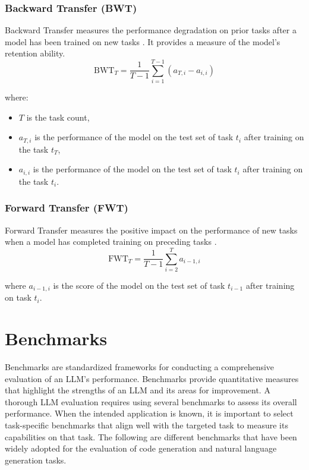 \subsubsection{Backward Transfer (BWT)} \label{bwt}
Backward Transfer measures the performance degradation on prior tasks after a model has been trained on new tasks \cite{wu2023online}. It provides a measure of the model’s retention ability.
\begin{equation}
\text{BWT}_T = \frac{1}{T-1} \sum_{i=1}^{T-1} \left( a_{T,i} - a_{i,i} \right)
\end{equation}

where:
\begin{itemize}
\item \( T \) is the task count,
\item \( a_{T,i} \) is the performance of the model on the test set of task \( t_i \) after training on the task \( t_T \),
\item \( a_{i,i} \) is the performance of the model on the test set of task \( t_i \) after training on the task \( t_i \).
\end{itemize}


\subsubsection{Forward Transfer (FWT)} \label{fwt}
Forward Transfer measures the positive impact on the performance of new tasks when a model has completed training on preceding tasks \cite{wu2023online}.
\begin{equation}
\text{FWT}_T = \frac{1}{T-1} \sum_{i=2}^{T} a_{i-1,i}
\end{equation}

where \( a_{i-1,i} \) is the score of the model on the test set of task \( t_{i-1} \) after training on task \( t_i \).



\section{Benchmarks} \label{benchmarks}
Benchmarks are standardized frameworks for conducting a comprehensive evaluation of an LLM's performance. Benchmarks provide quantitative measures that highlight the strengths of an LLM and its areas for improvement. A thorough LLM evaluation requires using several benchmarks to assess its overall performance. When the intended application is known, it is important to select task-specific benchmarks that align well with the targeted task to measure its capabilities on that task. The following are different benchmarks that have been widely adopted for the evaluation of code generation and natural language generation tasks.

